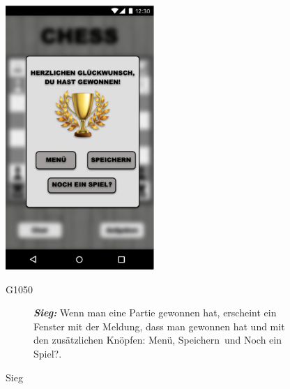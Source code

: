\documentclass[parskip=full]{scrartcl}
\begin{document}
	\begin{figure}[htp]
		\begin{minipage}[t]{6cm}
			\vspace{0pt}
			\includegraphics[height=100mm]{Sieg.png}
			\caption{Sieg}
			\label{fig:Sieg}
		\end{minipage}
		\hfill
		\begin{minipage}[t]{6cm}
			\vspace{0pt}
			\begin{description}
				\item[G1050] \textbf{\textit{Sieg: }} Wenn man eine Partie gewonnen hat, erscheint ein Fenster mit der Meldung, dass man gewonnen hat und mit den zusätzlichen Knöpfen: \glqq Menü\grqq, \glqq Speichern\grqq\ und \glqq Noch ein Spiel?\grqq.
			\end{description}
		\end{minipage}
		

\end{figure}
\end{document}
